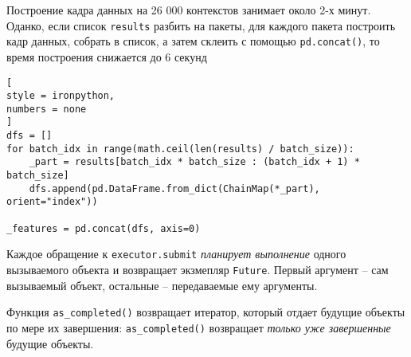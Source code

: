 \documentclass[%
	11pt,
	a4paper,
	utf8,
		]{article}
\begin{document}
Построение кадра данных на 26 000 контекстов занимает около 2-х минут. Оданко, если список \verb|results| разбить на пакеты, для каждого пакета построить кадр данных, собрать в список, а затем склеить с помощью \verb|pd.concat()|, то время построения снижается до 6 секунд
\begin{lstlisting}[
style = ironpython,
numbers = none
]
dfs = []
for batch_idx in range(math.ceil(len(results) / batch_size)):
    _part = results[batch_idx * batch_size : (batch_idx + 1) * batch_size]
    dfs.append(pd.DataFrame.from_dict(ChainMap(*_part), orient="index"))
    
_features = pd.concat(dfs, axis=0)
\end{lstlisting}

Каждое обращение к \verb|executor.submit| \emph{планирует выполнение} одного вызываемого объекта и возвращает экзмепляр \verb|Future|. Первый аргумент -- сам вызываемый объект, остальные -- передаваемые ему аргументы. 

Функция \verb|as_completed()| возвращает итератор, который отдает будущие объекты по мере их завершения: \verb|as_completed()| возвращает \emph{только уже завершенные} будущие объекты.
\end{document}
